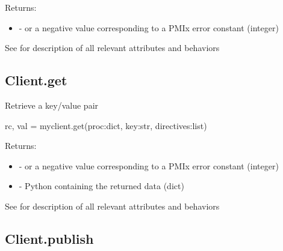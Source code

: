 \begin{arglist}
\end{arglist}

Returns:

\begin{itemize}
    \item {} -  or a negative value corresponding to a PMIx error constant (integer)
\end{itemize}


See  for description of all relevant attributes and behaviors


\subsection{Client.get}

\summary

Retrieve a key/value pair

\format

\pyspecificstart
\begin{codepar}
rc, val = myclient.get(proc:dict, key:str, directives:list)
\end{codepar}
\pyspecificend

\begin{arglist}
\end{arglist}

Returns:

\begin{itemize}
    \item {} -  or a negative value corresponding to a PMIx error constant (integer)
    \item {} - Python  containing the returned data (dict)
\end{itemize}


See  for description of all relevant attributes and behaviors


\subsection{Client.publish}

